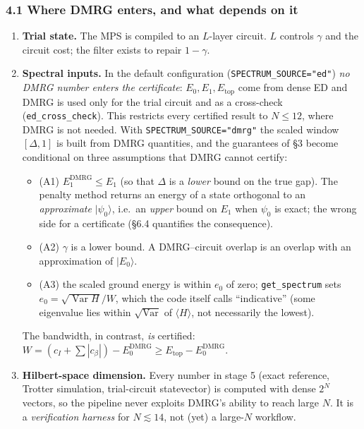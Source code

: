 \documentclass[
]{article}
\providecommand{\tightlist}{%
  \setlength{\itemsep}{0pt}\setlength{\parskip}{0pt}}
\begin{document}
\hypertarget{where-dmrg-enters-and-what-depends-on-it}{%
\subsubsection{4.1 Where DMRG enters, and what depends on
it}\label{where-dmrg-enters-and-what-depends-on-it}}

\begin{enumerate}
\def\labelenumi{\arabic{enumi}.}
\tightlist
\item
  \textbf{Trial state.} The MPS is compiled to an \(L\)-layer circuit.
  \(L\) controls \(\gamma\) and the circuit cost; the filter exists to
  repair \(1-\gamma\).
\item
  \textbf{Spectral inputs.} In the default configuration
  (\texttt{SPECTRUM\_SOURCE="ed"}) \emph{no DMRG number enters the
  certificate}: \(E_0,E_1,E_{\mathrm{top}}\) come from dense ED and DMRG
  is used only for the trial circuit and as a cross-check
  (\texttt{ed\_cross\_check}). This restricts every certified result to
  \(N\le12\), where DMRG is not needed. With
  \texttt{SPECTRUM\_SOURCE="dmrg"} the scaled window \([\Delta,1]\) is
  built from DMRG quantities, and the guarantees of §3 become
  conditional on three assumptions that DMRG cannot certify:

  \begin{itemize}
  \tightlist
  \item
    (A1) \(E_1^{\mathrm{DMRG}}\le E_1\) (so that \(\Delta\) is a
    \emph{lower} bound on the true gap). The penalty method returns an
    energy of a state orthogonal to an \emph{approximate}
    \(|\psi_0\rangle\), i.e.~an \emph{upper} bound on \(E_1\) when
    \(\psi_0\) is exact; the wrong side for a certificate (§6.4
    quantifies the consequence).
  \item
    (A2) \(\gamma\) is a lower bound. A DMRG--circuit overlap is an
    overlap with an approximation of \(|E_0\rangle\).
  \item
    (A3) the scaled ground energy is within \(e_0\) of zero;
    \texttt{get\_spectrum} sets \(e_0=\sqrt{\operatorname{Var}H}/W\),
    which the code itself calls ``indicative'' (some eigenvalue lies
    within \(\sqrt{\operatorname{Var}}\) of \(\langle H\rangle\), not
    necessarily the lowest).
  \end{itemize}

  The bandwidth, in contrast, \emph{is} certified:
  \(W=(c_I+\sum|c_\beta|)-E_0^{\mathrm{DMRG}}\ge E_{\mathrm{top}}-E_0^{\mathrm{DMRG}}\).
\item
  \textbf{Hilbert-space dimension.} Every number in stage 5 (exact
  reference, Trotter simulation, trial-circuit statevector) is computed
  with dense \(2^{N}\) vectors, so the pipeline never exploits DMRG's
  ability to reach large \(N\). It is a \emph{verification harness} for
  \(N\lesssim 14\), not (yet) a large-\(N\) workflow.
\end{enumerate}
\end{document}
